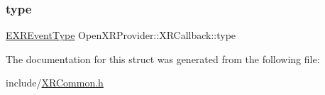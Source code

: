 \subsubsection{\texorpdfstring{type}{type}}
{\footnotesize\ttfamily \mbox{\hyperlink{namespace_open_x_r_provider_aa80d286c249d35071f2ff4d19d9dc4c3}{E\+X\+R\+Event\+Type}} Open\+X\+R\+Provider\+::\+X\+R\+Callback\+::type}



The documentation for this struct was generated from the following file\+:\begin{DoxyCompactItemize}
\item 
include/\mbox{\hyperlink{_x_r_common_8h}{X\+R\+Common.\+h}}\end{DoxyCompactItemize}
